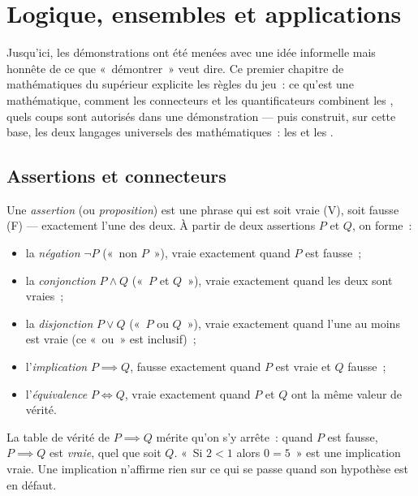 \chapter{Logique, ensembles et applications}\label{ch:b1:logic}

Jusqu'ici, les démonstrations ont été menées avec une idée informelle
mais honnête de ce que «~démontrer~» veut dire. Ce premier chapitre de
mathématiques du supérieur explicite les règles du jeu~: ce qu'est une
 mathématique, comment les connecteurs et les quantificateurs
combinent les , quels coups sont autorisés dans une
démonstration --- puis construit, sur cette base, les deux langages
universels des mathématiques~: les  et les .

\section{Assertions et connecteurs}

\begin{definition}\label{def:b1:logic:statement}
Une \emph{assertion} (ou \emph{proposition}) est une
phrase qui est soit vraie (V), soit fausse (F) --- exactement l'une des
deux. À partir de deux assertions $P$ et $Q$, on forme~:
\begin{itemize}
  \item la \emph{négation} $\lnot P$ («~non $P$~»), vraie exactement
        quand $P$ est fausse~;
  \item la \emph{conjonction} $P \land Q$ («~$P$ et $Q$~»), vraie
        exactement quand les deux sont vraies~;
  \item la \emph{disjonction} $P \lor Q$ («~$P$ ou $Q$~»), vraie
        exactement quand l'une au moins est vraie (ce «~ou~» est
        inclusif)~;
  \item l'\emph{implication} $P \implies Q$, fausse exactement quand $P$
        est vraie et $Q$ fausse~;
  \item l'\emph{équivalence} $P \iff Q$, vraie exactement quand $P$ et
        $Q$ ont la même valeur de vérité.
\end{itemize}
\end{definition}

\begin{remark}
La table de vérité de $P \implies Q$ mérite qu'on s'y arrête~: quand $P$
est fausse, $P \implies Q$ est \emph{vraie}, quel que soit $Q$. «~Si
$2 < 1$ alors $0 = 5$~» est une implication vraie. Une implication
n'affirme rien sur ce qui se passe quand son hypothèse est en défaut.
\end{remark}

